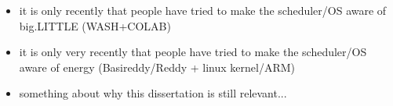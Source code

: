 \begin{itemize}
    \item it is only recently that people have tried to make the scheduler/OS
          aware of big.LITTLE (WASH+COLAB)
    \item it is only very recently that people have tried to make the
          scheduler/OS aware of energy (Basireddy/Reddy + linux kernel/ARM)
    \item something about why this dissertation is still relevant...
\end{itemize}
